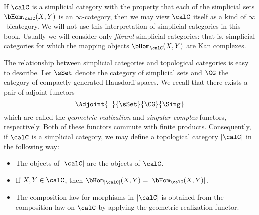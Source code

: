 \begin{remark}
If $\calC$ is a simplicial category with the property that each of the simplicial sets
$\bHom_{\calC}(X,Y)$ is an $\infty$-category, then we may view $\calC$ itself as a kind of $\infty$-bicategory. We will not use this interpretation of simplicial categories in this book. Usually we will consider only {\em fibrant} simplicial categories: that is, simplicial categories for which the mapping objects $\bHom_{\calC}(X,Y)$ are Kan complexes.
\end{remark}

The relationship between simplicial categories and topological categories is easy to describe. Let $\sSet$ denote the
category of simplicial sets and $\CG$ the category of compactly
generated Hausdorff spaces. We recall that there exists a pair of
adjoint functors
$$ \Adjoint{||}{\sSet}{\CG}{\Sing}$$
which are called the {\it geometric realization} and {\it
singular complex} functors, respectively. Both of these functors commute
with finite products. Consequently, if $\calC$ is a simplicial
category, we may define a topological category $|\calC|$ in the
following way:

\begin{itemize}
\item The objects of $|\calC|$ are the objects of $\calC$.

\item If $X,Y \in \calC$, then $\bHom_{|\calC|}(X,Y) = |
\bHom_{\calC}(X,Y)|$.

\item The composition law for morphisms in $|\calC|$ is obtained
from the composition law on $\calC$ by applying the geometric
realization functor.
\end{itemize}

